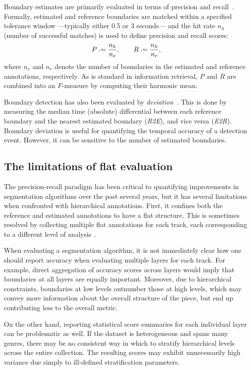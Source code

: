 \documentclass{article}
\begin{document}
Boundary estimates are primarily evaluated in terms of precision and recall~\cite{turnbull2007supervised}.
Formally, estimated and reference boundaries are matched within a specified tolerance window ---typically either 0.5 or 3 seconds--- and the hit rate $n_h$ (number of successful matches) is used to define precision and recall scores:
\begin{equation}
P \defeq \frac{n_h}{n_e}, \quad\quad R \defeq \frac{n_h}{n_r},
\end{equation}
where $n_e$ and $n_r$ denote the number of boundaries in the estimated and reference
annotations, respectively.
As is standard in information retrieval, $P$ and $R$ are combined into an $F$-measure by computing their harmonic mean.

Boundary detection has also been evaluated by \emph{deviation}~\cite{turnbull2007supervised}.
This is done by measuring the median time (absolute) differential between each reference boundary and the nearest estimated boundary (\emph{R2E}), and vice versa (\emph{E2R}).
Boundary deviation is useful for quantifying the temporal accuracy of a detection event.
However, it can be sensitive to the number of estimated boundaries.

\subsection{The limitations of flat evaluation}
The precision-recall paradigm has been critical to quantifying improvements in segmentation algorithms over the past several years, but it has several 
limitations when confronted with hierarchical annotations.
First, it confines both the reference and estimated annotations to have a flat structure.
This is sometimes resolved by collecting multiple flat annotations for each track, each corresponding to a different level of analysis~\cite{Smith2011}.  

When evaluating a segmentation algorithm, it is not immediately clear how one should report accuracy when evaluating multiple layers for each track.
For example, direct aggregation of accuracy scores across layers would imply that boundaries at all layers are equally important.
Moreover, due to hierarchical constraints, boundaries at low levels outnumber those at high levels, which may convey more information about the overall structure of the piece, but end up contributing less to the overall metric.

On the other hand, reporting statistical score summaries for each individual layer can be problematic as well.
If the dataset is heterogeneous and spans many genres, there may be no consistent way in which to stratify hierarchical levels across the entire collection.
The resulting scores may exhibit unnecessarily high variance due simply to ill-defined stratification parameters.
\end{document}
